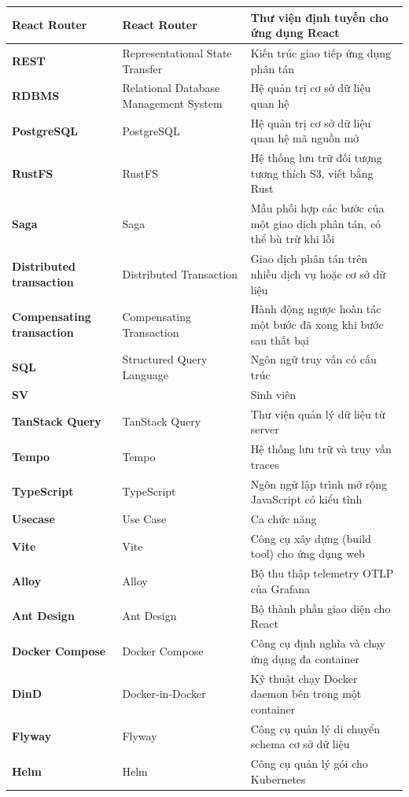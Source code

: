 \documentclass[../BTL.tex]{subfiles}
\begin{document}
\begin{longtable}{|p{3.2cm}|p{3.5cm}|p{7.1cm}|}
	\textbf{React Router} & React Router & Thư viện định tuyến cho ứng dụng React\\ \hline
	\textbf{REST} & Representational State Transfer & Kiến trúc giao tiếp ứng dụng phân tán\\ \hline
	\textbf{RDBMS} & Relational Database Management System & Hệ quản trị cơ sở dữ liệu quan hệ\\ \hline
	\textbf{PostgreSQL} & PostgreSQL & Hệ quản trị cơ sở dữ liệu quan hệ mã nguồn mở\\ \hline
	\textbf{RustFS} & RustFS & Hệ thống lưu trữ đối tượng tương thích S3, viết bằng Rust\\ \hline
	\textbf{Saga} & Saga & Mẫu phối hợp các bước của một giao dịch phân tán, có thể bù trừ khi lỗi\\ \hline
	\textbf{Distributed transaction} & Distributed Transaction & Giao dịch phân tán trên nhiều dịch vụ hoặc cơ sở dữ liệu\\ \hline
	\textbf{Compensating transaction} & Compensating Transaction & Hành động ngược hoàn tác một bước đã xong khi bước sau thất bại\\ \hline
	\textbf{SQL} & Structured Query Language & Ngôn ngữ truy vấn có cấu trúc\\ \hline
	\textbf{SV} & & Sinh viên\\ \hline
	\textbf{TanStack Query} & TanStack Query & Thư viện quản lý dữ liệu từ server\\ \hline
	\textbf{Tempo} & Tempo & Hệ thống lưu trữ và truy vấn traces\\ \hline
	\textbf{TypeScript} & TypeScript & Ngôn ngữ lập trình mở rộng JavaScript có kiểu tĩnh\\ \hline
	\textbf{Usecase} & Use Case & Ca chức năng\\ \hline
	\textbf{Vite} & Vite & Công cụ xây dựng (build tool) cho ứng dụng web\\ \hline
	\textbf{Alloy} & Alloy & Bộ thu thập telemetry OTLP của Grafana\\ \hline
	\textbf{Ant Design} & Ant Design & Bộ thành phần giao diện cho React\\ \hline
	\textbf{Docker Compose} & Docker Compose & Công cụ định nghĩa và chạy ứng dụng đa container\\ \hline
	\textbf{DinD} & Docker-in-Docker & Kỹ thuật chạy Docker daemon bên trong một container\\ \hline
	\textbf{Flyway} & Flyway & Công cụ quản lý di chuyển schema cơ sở dữ liệu\\ \hline
	\textbf{Helm} & Helm & Công cụ quản lý gói cho Kubernetes\\ \hline

\end{longtable}
\end{document}
